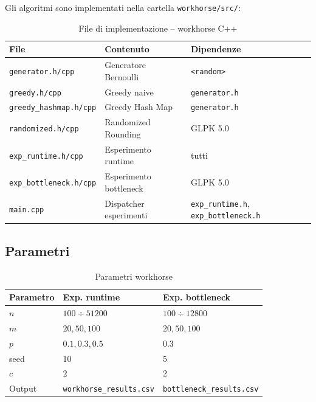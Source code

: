 \documentclass[12pt, a4paper]{article}
\begin{document}
Gli algoritmi sono implementati nella cartella \texttt{workhorse/src/}:

\begin{table}[H]
\centering
\caption{File di implementazione -- workhorse C++}
\label{tab:impl_wh}
\begin{tabular}{lll}
\toprule
File & Contenuto & Dipendenze \\
\midrule
\texttt{generator.h/cpp}       & Generatore Bernoulli        & \texttt{<random>} \\
\texttt{greedy.h/cpp}          & Greedy naive                & \texttt{generator.h} \\
\texttt{greedy\_hashmap.h/cpp} & Greedy Hash Map             & \texttt{generator.h} \\
\texttt{randomized.h/cpp}      & Randomized Rounding         & GLPK 5.0 \\
\texttt{exp\_runtime.h/cpp}    & Esperimento runtime         & tutti \\
\texttt{exp\_bottleneck.h/cpp} & Esperimento bottleneck      & GLPK 5.0 \\
\texttt{main.cpp}              & Dispatcher esperimenti      & \texttt{exp\_runtime.h}, \texttt{exp\_bottleneck.h} \\
\bottomrule
\end{tabular}
\end{table}


\subsection{Parametri}

\begin{table}[H]
\centering
\caption{Parametri workhorse}
\label{tab:params_wh}
\begin{tabular}{lll}
\toprule
Parametro & Exp. runtime & Exp. bottleneck \\
\midrule
$n$ & $100 \div 51200$ & $100 \div 12800$ \\
$m$ & $20, 50, 100$    & $20, 50, 100$ \\
$p$ & $0.1, 0.3, 0.5$  & $0.3$ \\
seed & 10              & 5 \\
$c$ & $2$              & $2$ \\
Output & \texttt{workhorse\_results.csv} & \texttt{bottleneck\_results.csv} \\
\bottomrule
\end{tabular}
\end{table}
\end{document}
